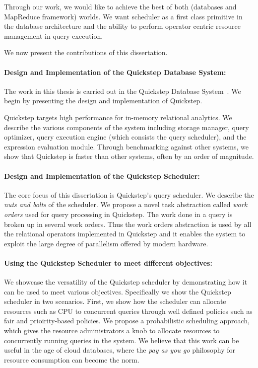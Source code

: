 Through our work, we would like to achieve the best of both (databases and MapReduce framework) worlds.
We want scheduler as a first class primitive in the database architecture and the ability to perform operator centric resource management in query execution. 

We now present the contributions of this dissertation. 

\paragraph{Design and Implementation of the Quickstep Database System:}
The work in this thesis is carried out in the Quickstep Database System~\cite{quickstep-vldb, patel1quickstep, Quickstep}.
We begin by presenting the design and implementation of Quickstep.

Quickstep targets high performance for in-memory relational analytics. 
We describe the various components of the system including storage manager, query optimizer, query execution engine (which consists the query scheduler), and the expression evaluation module. 
Through benchmarking against other systems, we show that Quickstep is faster than other systems, often by an order of magnitude.

\paragraph{Design and Implementation of the Quickstep Scheduler:}
The core focus of this dissertation is Quickstep's query scheduler. 
We describe the \textit{nuts and bolts} of the scheduler.
We propose a novel task abstraction called \textit{work orders} used for query processing in Quickstep.
The work done in a query is broken up in several work orders.
Thus the work orders abstraction is used by all the relational operators implemented in Quickstep and it enables the system to exploit the large degree of parallelism offered by modern hardware.

\paragraph{Using the Quickstep Scheduler to meet different objectives:}
We showcase the versatility of the Quickstep scheduler by demonstrating how it can be used to meet various objectives.
Specifically we show the Quickstep scheduler in two scenarios.
First, we show how the scheduler can allocate resources such as CPU to concurrent queries through well defined policies such as fair and prioirity-based policies.
We propose a probabilistic scheduling approach, which gives the resource administrators a knob to allocate resources to concurrently running queries in the system.
We believe that this work can be useful in the age of cloud databases, where the \textit{pay as you go} philosophy for resource consumption can become the norm.

